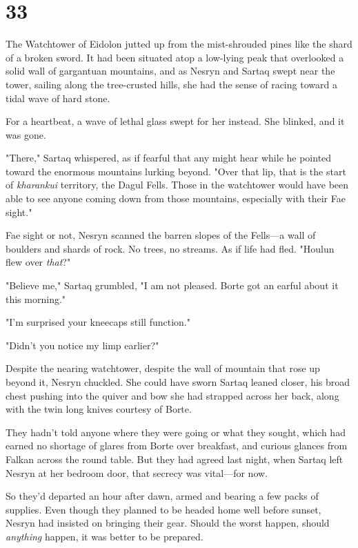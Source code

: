 
\chapter{33}

The Watchtower of Eidolon jutted up from the mist-shrouded pines like the shard of a broken sword. It had been situated atop a low-lying peak that overlooked a solid wall of gargantuan mountains, and as Nesryn and Sartaq swept near the tower, sailing along the tree-crusted hills, she had the sense of racing toward a tidal wave of hard stone.

For a heartbeat, a wave of lethal glass swept for her instead. She blinked, and it was gone.

"There," Sartaq whispered, as if fearful that any might hear while he pointed toward the enormous mountains lurking beyond. "Over that lip, that is the start of \emph{kharankui} territory, the Dagul Fells. Those in the watchtower would have been able to see anyone coming down from those mountains, especially with their Fae sight."

Fae sight or not, Nesryn scanned the barren slopes of the Fells---a wall of boulders and shards of rock. No trees, no streams. As if life had fled. "Houlun flew over \emph{that}?"

"Believe me," Sartaq grumbled, "I am not pleased. Borte got an earful about it this morning."

"I'm surprised your kneecaps still function."

"Didn't you notice my limp earlier?"

Despite the nearing watchtower, despite the wall of mountain that rose up beyond it, Nesryn chuckled. She could have sworn Sartaq leaned closer, his broad chest pushing into the quiver and bow she had strapped across her back, along with the twin long knives courtesy of Borte.

They hadn't told anyone where they were going or what they sought, which had earned no shortage of glares from Borte over breakfast, and curious glances from Falkan across the round table. But they had agreed last night, when Sartaq left Nesryn at her bedroom door, that secrecy was vital---for now.

So they'd departed an hour after dawn, armed and bearing a few packs of supplies. Even though they planned to be headed home well before sunset, Nesryn had insisted on bringing their gear. Should the worst happen, should \emph{anything} happen, it was better to be prepared.

